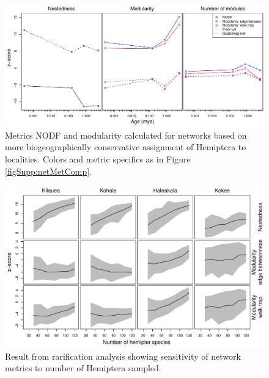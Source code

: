 \begin{figure}[!hp]
  \centering
  \includegraphics[scale=0.6]{figs/figSupp_netMetCons.pdf}
  \caption[NODF and modularity for non-conservative networks]{Metrics
    NODF and modularity calculated for networks based on more
    biogeographically conservative assignment of Hemiptera to
    localities. Colors and metric specifics as in Figure
    \ref{figSupp:netMetComp}.}
  \label{figSupp:netCons}
\end{figure}

\begin{figure}[!hp]
  \centering
  \includegraphics[scale=0.6]{figs/figSupp_rarified_prob1.pdf}
  \caption[Result from rarification analysis]{Result from rarification
    analysis showing sensitivity of network metrics to number of
    Hemiptera sampled.}
  \label{figSupp:rfy}
\end{figure}

